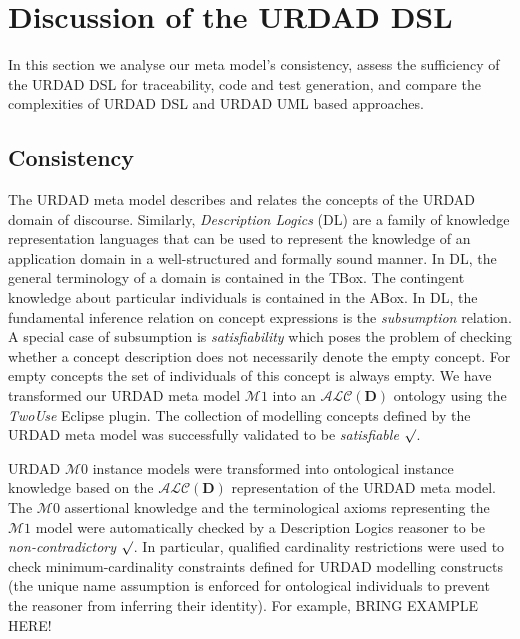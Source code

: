 \section{Discussion of the URDAD DSL \label{sec:assessment}}

In this section we analyse our meta model's consistency, 
assess the sufficiency of the URDAD DSL for traceability, 
code and test generation, and compare the complexities of 
URDAD DSL and URDAD UML based approaches.

\subsection{Consistency}
The URDAD meta model describes and relates the concepts of 
the URDAD domain of discourse. Similarly, \emph{Description 
Logics} (DL) are a family of knowledge representation languages 
that can be used to represent the knowledge of an application 
domain in a well-structured and formally sound manner. In DL,
the general terminology of a domain is contained in the TBox. 
The contingent knowledge about particular individuals is 
contained in the ABox. In DL, the fundamental inference 
relation on concept expressions is the \emph{subsumption} 
relation. A special case of subsumption is \emph{satisfiability}
which poses the problem of checking whether a concept description 
does not necessarily denote the empty concept. For empty concepts 
the set of individuals of this concept is always empty. We 
have transformed our URDAD meta model $\mathcal{M}1$ into an 
$\mathcal{ALC}(\textbf{D})$ ontology using the \emph{TwoUse}
\cite{parreiras_using_2010} Eclipse plugin. The collection 
of modelling concepts defined by the URDAD meta model was 
successfully validated to be \emph{satisfiable} $\surd$.

URDAD $\mathcal{M}0$ instance models were transformed into 
ontological instance knowledge based on the $\mathcal{ALC}(\textbf{D})$
representation of the URDAD meta model. The $\mathcal{M}0$ 
assertional knowledge and the terminological axioms representing 
the $\mathcal{M}1$ model were automatically checked by a 
Description Logics reasoner to be \emph{non-contradictory}
$\surd$. In particular, qualified cardinality restrictions
were used to check minimum-cardinality constraints defined 
for URDAD modelling constructs (the unique name assumption 
is enforced for ontological individuals to prevent the 
reasoner from inferring their identity). For example, 
BRING EXAMPLE HERE!

